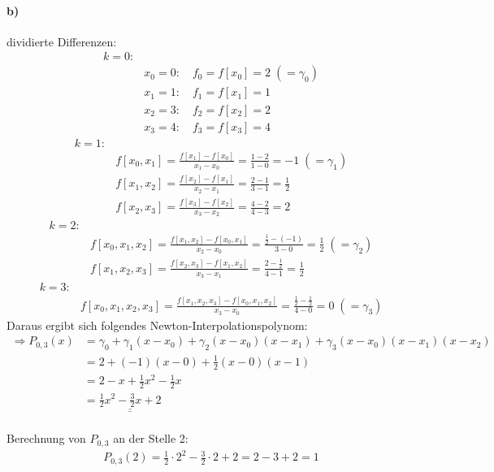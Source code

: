 \paragraph*{b)}dividierte Differenzen:
\begin{align*}
k=0:\\
&x_0=0: \quad f_0=f[x_0]=2\;(=\gamma_0)\\
&x_1=1: \quad f_1=f[x_1]=1\\
&x_2=3: \quad f_2=f[x_2]=2\\
&x_3=4: \quad f_3=f[x_3]=4
\end{align*}
\begin{align*}
k=1:\\
&f[x_0,x_1]=\frac{f[x_1]-f[x_0]}{x_1-x_0}=\frac{1-2}{1-0}=-1\;(=\gamma_1)\\
&f[x_1,x_2]=\frac{f[x_2]-f[x_1]}{x_2-x_1}=\frac{2-1}{3-1}=\frac{1}{2}\\
&f[x_2,x_3]=\frac{f[x_3]-f[x_2]}{x_3-x_2}=\frac{4-2}{4-3}=2
\end{align*}
\begin{align*}
k=2:\\
&f[x_0,x_1,x_2]=\frac{f[x_1,x_2]-f[x_0,x_1]}{x_2-x_0}=\frac{\frac{1}{2}-(-1)}{3-0}=\frac{1}{2}\;(=\gamma_2)\\
&f[x_1,x_2,x_3]=\frac{f[x_2,x_3]-f[x_1,x_2]}{x_3-x_1}=\frac{2-\frac{1}{2}}{4-1}=\frac{1}{2}
\end{align*}
\begin{align*}
k=3:\\
&f[x_0,x_1,x_2,x_3]=\frac{f[x_1,x_2,x_3]-f[x_0,x_1,x_2]}{x_3-x_0}=\frac{\frac{1}{2}-\frac{1}{2}}{4-0}=0\;(=\gamma_3)
\end{align*}
Daraus ergibt sich folgendes Newton-Interpolationspolynom:
\begin{align*}
\Rightarrow P_{0,3}(x)&=\gamma_0+\gamma_1 (x-x_0)+\gamma_2(x-x_0)(x-x_1)+\gamma_3(x-x_0)(x-x_1)(x-x_2)\\
&=2+(-1)(x-0)+\frac{1}{2}(x-0)(x-1)\\
&=2-x+\frac{1}{2}x^2-\frac{1}{2}x\\
&=\underline{\underline{\frac{1}{2}x^2-\frac{3}{2}x+2}}
\end{align*}\\
Berechnung von $P_{0,3}$ an der Stelle 2:
\begin{align*}
P_{0,3}(2)=\frac{1}{2}\cdot 2^2-\frac{3}{2}\cdot 2+2=2-3+2=1
\end{align*}
